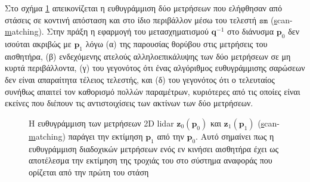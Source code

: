 Στο σχήμα \ref{fig:sm_principle} απεικονίζεται η ευθυγράμμιση δύο μετρήσεων που
ελήφθησαν από στάσεις σε κοντινή απόσταση και στο ίδιο περιβάλλον μέσω του
τελεστή $\texttt{sm}$ (\underline{s}can-\underline{m}atching). Στην πράξη η
εφαρμογή του μετασχηματισμού $\bm{q}^{-1}$ στο διάνυσμα $\bm{p}_0$ δεν ισούται
ακριβώς με $\bm{p}_1$ λόγω (α) της παρουσίας θορύβου στις μετρήσεις του
αισθητήρα, (β) ενδεχόμενης ατελούς αλληλοεπικάλυψης των δύο μετρήσεων σε μη
κυρτά περιβάλλοντα, (γ) του γεγονότος ότι ένας αλγόριθμος ευθυγράμμισης
σαρώσεων δεν είναι απαραίτητα τέλειος τελεστής, και (δ) του γεγονότος ότι ο
τελευταίος συνήθως απαιτεί τον καθορισμό πολλών παραμέτρων, κυριότερες από τις
οποίες είναι εκείνες που διέπουν τις αντιστοιχίσεις των ακτίνων των δύο
μετρήσεων.

\begin{figure}[htbp]\centering\vspace{1cm}
  
  \vspace{0.5cm}
  \caption{\small Η ευθυγράμμιση των μετρήσεων 2D lidar $\bm{z}_0(\bm{p}_0)$ και
           $\bm{z}_1(\bm{p}_1)$ (\underline{s}can-\underline{m}atching)
           παράγει την εκτίμηση $\bm{p}_1$ από την $\bm{p}_0$. Αυτό σημαίνει πως
           η ευθυγράμμιση διαδοχικών μετρήσεων ενός εν κινήσει αισθητήρα
           έχει ως αποτέλεσμα την εκτίμηση της τροχιάς του στο σύστημα
           αναφοράς που ορίζεται από την πρώτη του στάση}
  \label{fig:sm_principle}
\end{figure}


